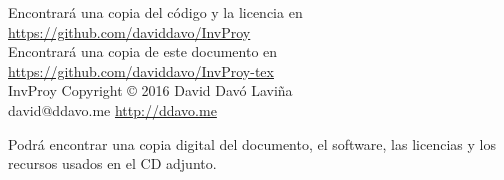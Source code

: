 \documentclass[a4paper, 11pt]{report} %
\begin{document}
\noindent
Encontrará una copia del código y la licencia en \url{https://github.com/daviddavo/InvProy} \\
Encontrará una copia de este documento en \url{https://github.com/daviddavo/InvProy-tex}\\

\centering
InvProy \hspace*{10pt} Copyright \copyright\hspace*{10pt} 2016 \hspace*{15pt} David Davó Laviña \\ \hspace*{15pt} david@ddavo.me \hspace*{10pt} \url{http://ddavo.me}

\vspace{0.7cm}
\noindent\centering
\begin{minipage}{13cm}
\centering Podrá encontrar una copia digital del documento, el software, las licencias y los recursos usados en el CD adjunto.
\end{minipage}

\vspace*{1cm}
\centering\framebox[12.5cm]{
\raisebox{0pt}[12.5cm][0pt]{
}} %

\end{document}
